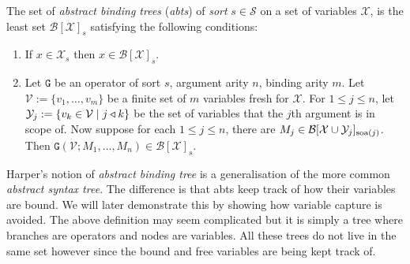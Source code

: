 \begin{defin}\label{abt}
    The set of \emph{abstract binding trees} (\emph{abts}) of \emph{sort} $s\in \mathcal{S}$ on a set of variables $\mathcal{X}$, is the least set $\mathcal{B}[\mathcal{X}]_s$ satisfying the following conditions:
    \begin{enumerate}
        \item If $x \in \mathcal{X}_s$ then $x \in \mathcal{B}[\mathcal{X}]_s$.
        \item Let $\mathtt{G}$ be an operator of sort $s$, argument arity $n$, binding arity $m$. Let $\mathcal{V} := \{v_1, \dots , v_m \}$ be a finite set of $m$ variables fresh for $\mathcal{X}$. For $1 \le j \le n$, let $\mathcal{Y}_j := \{ v_k \in \mathcal{V} \mid j \triangleleft k\}$ be the set of variables that the $j$th argument is in scope of. Now suppose for each $1 \le j \le n$, there are $M_j \in \mathcal{B}[\mathcal{X} \cup \mathcal{Y}_j]_{\text{soa}(j)}$. Then $\mathtt{G}(\mathcal{V}; M_1, \dots, M_n) \in \mathcal{B}[\mathcal{X}]_s$.
    \end{enumerate}
    
\end{defin}

\begin{remark}
    Harper's notion of \emph{abstract binding tree} is a generalisation of the more common \emph{abstract syntax tree}. The difference is that abts keep track of how their variables are bound. We will later demonstrate this by showing how variable capture is avoided. The above definition may seem complicated but it is simply a tree where branches are operators and nodes are variables. All these trees do not live in the same set however since the bound and free variables are being kept track of.
\end{remark}

